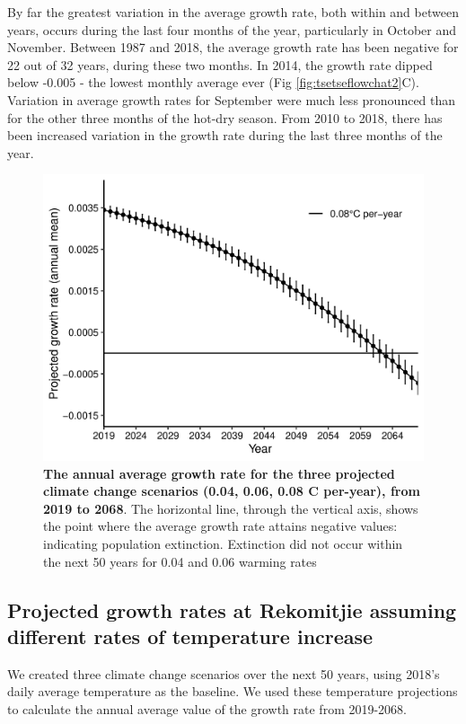 \documentclass[12pt,a4paper]{article}
\begin{document}
\newpage

By far the greatest variation in the average growth rate, both within and between years, occurs during the last four months of the year, particularly in October and November. Between 1987 and 2018, the average growth rate has been negative for 22  out of 32 years, during these two months. In 2014, the growth rate dipped below -0.005 - the lowest monthly average ever (Fig \ref{fig:tsetseflowchat2}C). Variation in average growth rates for September were much less pronounced than for the other three months of the hot-dry season. From 2010 to 2018, there has been increased variation in the growth rate during the last three months of the year. 


\begin{figure}[h]
	\centering
	\includegraphics[width=0.8\linewidth]{ProjectionwithErrBar}
\caption{{\bf The annual average growth rate for the three projected climate change scenarios (0.04, 0.06, 0.08 \degree C per-year), from 2019 to 2068}. The horizontal line, through the vertical axis, shows the point where the average growth rate attains negative values: indicating population extinction. Extinction did not occur within the next 50 years for 0.04 and 0.06 warming rates}
	\label{fig:tsetseflowchat4}
\end{figure}

\subsection*{Projected growth rates at Rekomitjie assuming different rates of temperature increase}
We created three climate change scenarios over the next 50 years, using 2018's daily average temperature as the baseline. We used these temperature projections to calculate the annual average value of the growth rate from 2019-2068.
\end{document}
